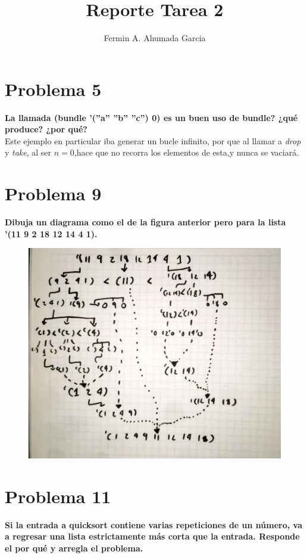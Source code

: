 \documentclass[11pt,a4paper]{report}
\author{Fermin A. Ahumada Garcia}
\title{Reporte Tarea 2}
\begin{document}
\maketitle
\section*{Problema 5 }
\textbf{La llamada (bundle ’(”a” ”b” ”c”) 0) es un buen uso de bundle? ¿qué produce? ¿por qué?}\\
Este ejemplo en particular iba generar un bucle infinito, por que al llamar a \textit{drop} y \textit{take}, al ser  $n = 0$,hace que no recorra los elementos de esta,y nunca se vaciará.
\section*{Problema 9}
\textbf{Dibuja un diagrama como el de la figura anterior pero para la lista ’(11 9 2 18 12
14 4 1).}\\
\begin{figure}[ht]
\includegraphics[width=15cm]{image}
\centering
\end{figure}
\section*{Problema 11}
\textbf{Si la entrada a quicksort contiene varias repeticiones de un número, va a regresar una lista estrictamente más corta que la entrada. Responde el por qué y arregla el problema.}
\end{document}
